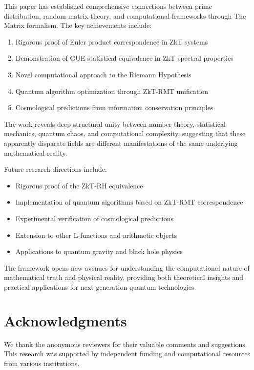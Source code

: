 \documentclass[12pt]{article}
\theoremstyle{plain}
\theoremstyle{definition}
\begin{document}
This paper has established comprehensive connections between prime distribution, random matrix theory, and computational frameworks through The Matrix formalism. The key achievements include:

\begin{enumerate}
\item Rigorous proof of Euler product correspondence in ZkT systems
\item Demonstration of GUE statistical equivalence in ZkT spectral properties
\item Novel computational approach to the Riemann Hypothesis
\item Quantum algorithm optimization through ZkT-RMT unification
\item Cosmological predictions from information conservation principles
\end{enumerate}

The work reveals deep structural unity between number theory, statistical mechanics, quantum chaos, and computational complexity, suggesting that these apparently disparate fields are different manifestations of the same underlying mathematical reality.

Future research directions include:

\begin{itemize}
\item Rigorous proof of the ZkT-RH equivalence
\item Implementation of quantum algorithms based on ZkT-RMT correspondence
\item Experimental verification of cosmological predictions
\item Extension to other L-functions and arithmetic objects
\item Applications to quantum gravity and black hole physics
\end{itemize}

The framework opens new avenues for understanding the computational nature of mathematical truth and physical reality, providing both theoretical insights and practical applications for next-generation quantum technologies.

\section*{Acknowledgments}

We thank the anonymous reviewers for their valuable comments and suggestions. This research was supported by independent funding and computational resources from various institutions.
\end{document}
